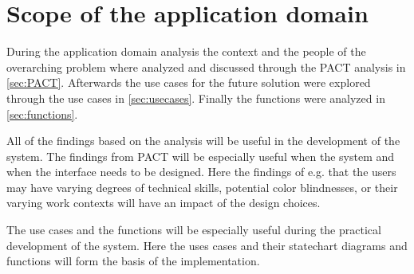 \section{Scope of the application domain}

During the application domain analysis the context and the people of the overarching problem where analyzed and discussed through the PACT analysis in \cref{sec:PACT}.
Afterwards the use cases for the future solution were explored through the use cases in \cref{sec:usecases}.
Finally the functions were analyzed in \cref{sec:functions}.

All of the findings based on the analysis will be useful in the development of the system.
The findings from PACT will be especially useful when the system and when the interface needs to be designed.
Here the findings of e.g. that the users may have varying degrees of technical skills, potential color blindnesses, or their varying work contexts will have an impact of the design choices.

The use cases and the functions will be especially useful during the practical development of the system.
Here the uses cases and their statechart diagrams and functions will form the basis of the implementation.
